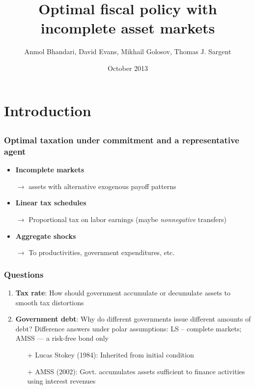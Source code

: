 \documentclass{beamer}
\title {Optimal fiscal policy with incomplete asset markets}
\author{Anmol Bhandari, David Evans, Mikhail Golosov, Thomas J. Sargent}
\date{October 2013}
\begin{document}
%
\begin{frame}
\titlepage

\end{frame}
\section{Introduction}
\subsection{}
\begin{frame}
\frametitle{Optimal taxation under commitment and a representative agent}

\begin{itemize}

 \item \textbf{Incomplete markets}

 \quad \color{red}$\rightarrow$ \color{black} assets with alternative exogenous payoff patterns

 \item \textbf{Linear tax schedules}

 \quad \color{red}$\rightarrow$ \color{black}Proportional tax on labor earnings (maybe  {\em nonnegative} transfers)

 \item \textbf{Aggregate shocks}

 \quad \color{red}$\rightarrow$ \color{black} To productivities, government expenditures,  etc.

 \end{itemize}
\end{frame}



\begin{frame}
\frametitle{Questions}

\begin{enumerate}
\item \textbf{Tax rate}: How should  government accumulate or decumulate assets to smooth tax  distortions
\item \textbf{Government debt}: Why do different governments issue different amounts of debt?
Difference answers under polar assumptions:  LS -- complete markets; AMSS --- a risk-free bond only
\begin{itemize}
 \item [+] Lucas Stokey (1984): Inherited from initial condition
 \item [+ ] AMSS (2002): Govt. accumulates assets sufficient to finance activities using interest revenues
\end{itemize}

\end{enumerate}
\end{frame}
\end{document}

